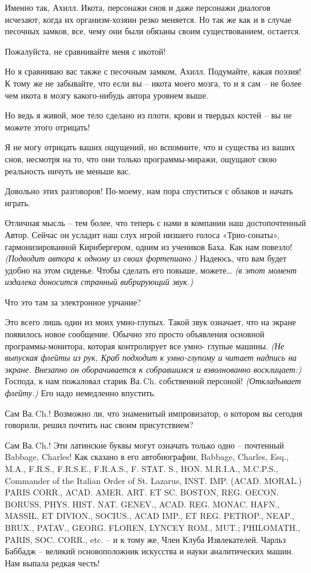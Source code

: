 \documentclass[../main.tex]{subfiles}
\begin{document}
\begin{dialogue}
 Именно так, Ахилл. Икота, персонажи снов и даже персонажи диалогов исчезают, когда их организм-хозяин резко меняется. Но так же как и в случае песочных замков, все, чему они были обязаны своим существованием, остается.

 Пожалуйста, не сравнивайте меня с икотой!

 Но я сравниваю вас также с песочным замком, Ахилл. Подумайте, какая поэзия! К тому же не забывайте, что если вы \--- икота моего мозга, то и я сам \--- не более чем икота в мозгу какого-нибудь автора уровнем выше.

 Но ведь я живой, мое тело сделано из плоти, крови и твердых костей \--- вы не можете этого отрицать!

 Я не могу отрицать ваших ощущений, но вспомните, что и существа из ваших снов, несмотря на то, что они только программы-миражи, ощущают свою реальность ничуть не меньше вас.

 Довольно этих разговоров! По-моему, нам пора спуститься с облаков и начать играть.

 Отличная мысль \--- тем более, что теперь с нами в компании наш достопочтенный Автор. Сейчас он усладит наш слух игрой низшего голоса «Трио-сонаты», гармонизированной Кирнбергером, одним из учеников Баха. Как нам повезло! \emph{(Подводит автора к одному из своих фортепиано.)} Надеюсь, что вам будет удобно на этом сиденье. Чтобы сделать его повыше, можете\ldots{} \emph{(в этот момент издалека доносится странный вибрирующий звук.)}

 Что это там за электронное урчание?

 Это всего лишь один из моих умно-глупых. Такой звук означает, что на экране появилось новое сообщение. Обычно это просто объявления основной программы-монитора, которая контролирует все умно- глупые машины. \emph{(Не выпуская флейты из рук, Краб подходит к умно-глупому и читает надпись на экране. Внезапно он оборачивается к собравшимся и взволнованно восклицает:)} Господа, к нам пожаловал старик Ва.\,Ch. собственной персоной! \emph{(Откладывает флейту.)} Его надо немедленно впустить.

 Сам Ва.\,Ch.! Возможно ли, что знаменитый импровизатор, о котором вы сегодня говорили, решил почтить нас своим присутствием?

 Сам Ва.\,Ch.! Эти латинские буквы могут означать только одно \--- почтенный Babbage, Charles! Как сказано в его автобиографии, Babbage, Charles, Esq., M.A., F.R.S., F.R.S.E., F.R.A.S., F. STAT. S., HON. M.R.I.A., M.C.P.S., Commander of the Italian Order of St. Lazarus, INST. IMP. (ACAD. MORAL.) PARIS CORR., ACAD. AMER. ART. ET SC. BOSTON, REG. OECON. BORUSS, PHYS. HIST. NAT. GENEV., ACAD. REG. MONAC. HAFN., MASSIL, ET DIVION., SOCIUS., ACAD IMP., ET REG. PETROP., NEAP., BRUX., PATAV., GEORG. FLOREN, LYNCEY ROM., MUT.; PHILOMATH., PARIS, SOC. CORR., etc. \--- и к тому же, Член Клуба Извлекателей. Чарльз Баббадж \--- великий основоположник искусства и науки аналитических машин. Нам выпала редкая честь!


\end{dialogue}
\end{document}
